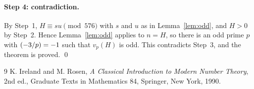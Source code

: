 \documentclass[11pt]{article}
\newcommand{\leg}[2]{\mathchoice{\biggl(\dfrac{#1}{#2}\biggr)}{(#1/#2)}{(#1/#2)}{(#1/#2)}}
\begin{document}
\paragraph{Step 4: contradiction.} By Step~1, $H\equiv su\pmod{576}$ with $s$ and $u$ as in Lemma~\ref{lem:odd}, and $H>0$ by Step~2. Hence Lemma~\ref{lem:odd} applies to $n=H$, so there is an odd prime $p$ with $\leg{-3}{p}=-1$ such that $v_p(H)$ is odd. This contradicts Step~3, and the theorem is proved.
\qed

\begin{thebibliography}{9}
 K. Ireland and M. Rosen, \emph{A Classical Introduction to Modern Number Theory}, 2nd ed., Graduate Texts in Mathematics 84, Springer, New York, 1990.
\end{thebibliography}
\end{document}
